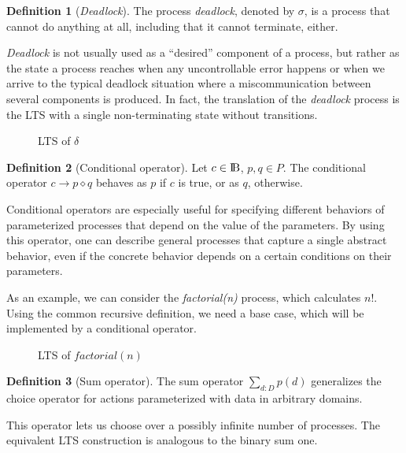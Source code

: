 \documentclass[11pt]{article}
\theoremstyle{definition}
\newtheorem{definition}{Definition}
\theoremstyle{plain}
\begin{document}
\begin{definition} [\textit{Deadlock}]
	The process \textit{deadlock}, denoted by $ \sigma $, is a process that cannot do anything at all, including that it cannot terminate, either.
\end{definition}
\textit{Deadlock} is not usually used as a ``desired'' component of a process, but rather as the state a process reaches when any uncontrollable error happens or when we arrive to the typical deadlock situation where a miscommunication between several components is produced. In fact, the translation of the \textit{deadlock} process is the LTS with a single non-terminating state without transitions.
\begin{figure} [H]
	\centering
	
	\caption{LTS of $\delta$} \label{fig:DeadlockDelta}
\end{figure}
\begin{definition} [Conditional operator]
	Let $ c \in \rm I\!B $, $ p, q \in P$. The conditional operator $ c\rightarrow p \diamond q $ behaves as $ p $ if $ c $ is true, or as $ q $, otherwise.
\end{definition}
Conditional operators are especially useful for specifying different behaviors of parameterized processes that depend on the value of the parameters. By using this operator, one can describe general processes that capture a single abstract behavior, even if the concrete behavior depends on a certain conditions on their parameters.

As an example, we can consider the \textit{factorial(n)} process, which calculates $ n! $. Using the common recursive definition, we need a base case, which will be implemented by a conditional operator.

\begin{figure} [H]
	\centering
	
	\caption{LTS of $factorial(n)$} \label{fig:ConditionalFactorial}
\end{figure}
\begin{definition} [Sum operator]
	The sum operator $ \sum_{d:D} p(d) $ generalizes the choice operator for actions parameterized with data in arbitrary domains.
\end{definition}

This operator lets us choose over a possibly infinite number of processes. The equivalent LTS construction is analogous to the binary sum one.
\end{document}
